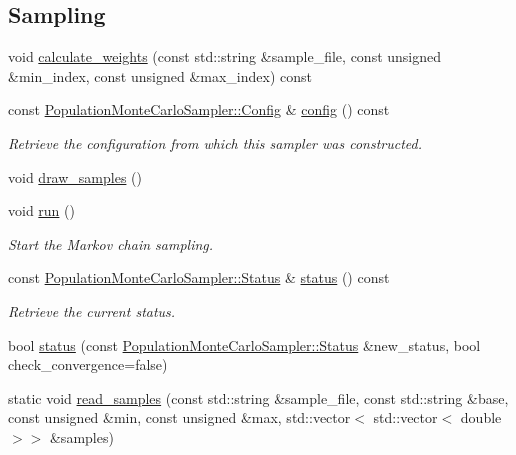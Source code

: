 \subsection*{Sampling}
\label{_amgrp1d07814d12178c958e4233501cb0bdc7}
 \begin{DoxyCompactItemize}
\item 
void \hyperlink{classeos_1_1PopulationMonteCarloSampler_acce93bba46d62aba651ccbf9dd7dd97e}{calculate\_\-weights} (const std::string \&sample\_\-file, const unsigned \&min\_\-index, const unsigned \&max\_\-index) const 
\item 
const \hyperlink{structeos_1_1PopulationMonteCarloSampler_1_1Config}{PopulationMonteCarloSampler::Config} \& \hyperlink{classeos_1_1PopulationMonteCarloSampler_ad5cdbdb944ffd933a76b58915c366ecc}{config} () const 
\begin{DoxyCompactList}\small\item\em Retrieve the configuration from which this sampler was constructed. \item\end{DoxyCompactList}\item 
void \hyperlink{classeos_1_1PopulationMonteCarloSampler_a89aafb7a0eea4a3d3f7c14c4678cb4fa}{draw\_\-samples} ()
\item 
void \hyperlink{classeos_1_1PopulationMonteCarloSampler_a7df73b99d042f2b41a37e9acca29eebd}{run} ()
\begin{DoxyCompactList}\small\item\em Start the Markov chain sampling. \item\end{DoxyCompactList}\item 
const \hyperlink{structeos_1_1PopulationMonteCarloSampler_1_1Status}{PopulationMonteCarloSampler::Status} \& \hyperlink{classeos_1_1PopulationMonteCarloSampler_a0557e83dff8bc5befde6a43ede580f84}{status} () const 
\begin{DoxyCompactList}\small\item\em Retrieve the current status. \item\end{DoxyCompactList}\item 
bool \hyperlink{classeos_1_1PopulationMonteCarloSampler_a96d11e8d79528f5ea69f0c243dbf659f}{status} (const \hyperlink{structeos_1_1PopulationMonteCarloSampler_1_1Status}{PopulationMonteCarloSampler::Status} \&new\_\-status, bool check\_\-convergence=false)
\item 
static void \hyperlink{classeos_1_1PopulationMonteCarloSampler_a69d7eee659c32197c19424aaf74a1eb8}{read\_\-samples} (const std::string \&sample\_\-file, const std::string \&base, const unsigned \&min, const unsigned \&max, std::vector$<$ std::vector$<$ double $>$$>$ \&samples)
\end{DoxyCompactItemize}



